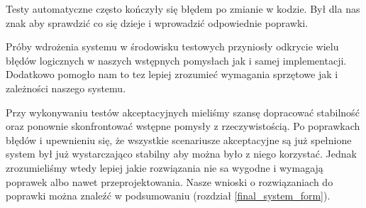 \documentclass[../analiza-rozwiazania.tex]{subfiles}
\begin{document}
Testy automatyczne często kończyły się błędem po zmianie w kodzie.
Był dla nas znak aby sprawdzić co się dzieje i wprowadzić odpowiednie poprawki.

Próby wdrożenia systemu w środowisku testowych przyniosły odkrycie wielu błędów logicznych w naszych wstępnych pomysłach jak i samej implementacji.
Dodatkowo pomogło nam to tez lepiej zrozumieć wymagania sprzętowe jak i zależności naszego systemu.

Przy wykonywaniu testów akceptacyjnych mieliśmy szansę dopracować stabilność oraz ponownie skonfrontować wstępne pomysły z rzeczywistością.
Po poprawkach błędów i upewnieniu się, że wszystkie scenariusze akceptacyjne są już spełnione system był już wystarczająco stabilny aby można było z niego korzystać.
Jednak zrozumieliśmy wtedy lepiej jakie rozwiązania nie sa wygodne i wymagają poprawek albo nawet przeprojektowania.
Nasze wnioski o rozwiązaniach do poprawki można znaleźć w podsumowaniu (rozdział \ref{final_system_form}).
\end{document}
